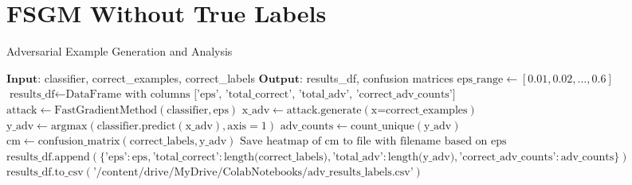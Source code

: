 \documentclass[11pt,onside]{article}
\begin{document}
\clearpage %

\section{FSGM Without True Labels}

\begin{algorithm}[H]
\caption{Adversarial Example Generation and Analysis}
\begin{algorithmic}[1]
\State $\textbf{Input:}$ classifier, correct\_examples, correct\_labels
\State $\textbf{Output:}$ results\_df, confusion matrices
\State $\text{eps\_range} \gets [0.01, 0.02, \ldots, 0.6]$
\State $\text{results\_df} \gets \text{DataFrame with columns ['eps', 'total\_correct', 'total\_adv', 'correct\_adv\_counts']}$
    \State $\text{attack} \gets \text{FastGradientMethod}(\text{classifier}, \text{eps})$
    \State $\text{x\_adv} \gets \text{attack.generate}(\text{x=correct\_examples})$
    \State $\text{y\_adv} \gets \text{argmax}(\text{classifier.predict}(\text{x\_adv}), \text{axis}=1)$
    \State $\text{adv\_counts} \gets \text{count\_unique}(\text{y\_adv})$
    \State $\text{cm} \gets \text{confusion\_matrix}(\text{correct\_labels}, \text{y\_adv})$
    \State $\text{Save heatmap of cm to file with filename based on eps}$
    \State $\text{results\_df.append}(\{\text{'eps'}: \text{eps}, \text{'total\_correct'}: \text{length(correct\_labels)}, \text{'total\_adv'}: \text{length(y\_adv)}, \text{'correct\_adv\_counts'}: \text{adv\_counts}\})$
\EndFor
\State $\text{results\_df.to\_csv}(\text{'/content/drive/MyDrive/ColabNotebooks/adv\_results\_labels.csv'})$
\end{algorithmic}
\end{algorithm}
\end{document}
